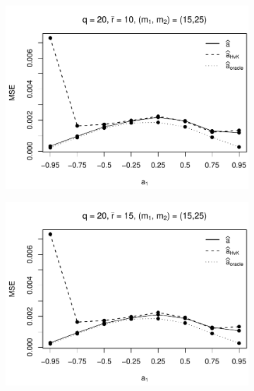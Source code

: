 \begin{figure}[p]
\begin{subfigure}[b]{0.45\textwidth}
\includegraphics[width=\textwidth]{Plots/Robustness/MSE_a1_T=500_slope=1_(q,K1,K2,M1,M2)=(20,2,10,15,25).pdf}
\end{subfigure}
\hspace{0.25cm}
\begin{subfigure}[b]{0.45\textwidth}
\includegraphics[width=\textwidth]{Plots/Robustness/MSE_a1_T=500_slope=1_(q,K1,K2,M1,M2)=(20,2,15,15,25).pdf}
\end{subfigure}


\end{figure}
